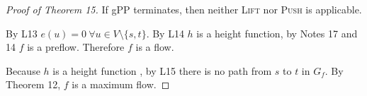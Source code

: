 \documentclass[12pt,oneside,a4paper,parskip=on,fleqn]{scrartcl}
\begin{document}
	\begin{proof}[Proof of Theorem 15]
		If gPP terminates, then neither \textsc{Lift} nor \textsc{Push} is applicable.

		By L13 $e(u) = 0\ \forall u\in V\setminus\{s,t\}$. By L14 $h$ is a height function, by Notes 17 and 14 $f$ is a preflow. Therefore $f$ is a flow.

		Because $h$ is a height function , by L15 there is no path from $s$ to $t$ in $G_f$. By Theorem 12, $f$ is a maximum flow.
	\end{proof}
\end{document}
